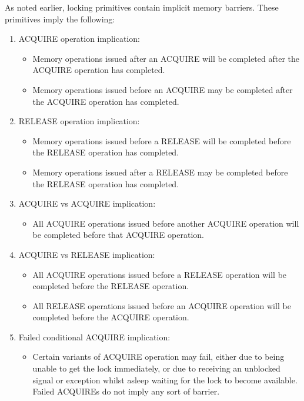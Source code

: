 As noted earlier, locking primitives contain implicit memory barriers.
These primitives imply the following:
\begin{enumerate}
\item	ACQUIRE operation implication:
	\begin{itemize}
	\item	Memory operations issued after an ACQUIRE will be completed
		after the ACQUIRE operation has completed.
	\item	Memory operations issued before an ACQUIRE may be completed
		after the ACQUIRE operation has completed.
	\end{itemize}
\item	RELEASE operation implication:
	\begin{itemize}
	\item	Memory operations issued before a RELEASE will be
		completed before the RELEASE operation has completed.
	\item	Memory operations issued after a RELEASE may be completed
		before the RELEASE operation has completed.
	\end{itemize}
\item	ACQUIRE vs ACQUIRE implication:
	\begin{itemize}
	\item	All ACQUIRE operations issued before another ACQUIRE operation
		will be completed before that ACQUIRE operation.
	\end{itemize}
\item	ACQUIRE vs RELEASE implication:
	\begin{itemize}
	\item	All ACQUIRE operations issued before a RELEASE operation
		will be completed before the RELEASE operation.
	\item	All RELEASE operations issued before an ACQUIRE operation
		will be completed before the ACQUIRE operation.
	\end{itemize}
\item	Failed conditional ACQUIRE implication:
	\begin{itemize}
	\item	Certain variants of ACQUIRE operation may fail, either
		due to being unable to get the lock immediately, or due
		to receiving an unblocked signal or exception
		whilst asleep waiting
		for the lock to become available.  Failed ACQUIREs do not
		imply any sort of barrier.
	\end{itemize}
\end{enumerate}

